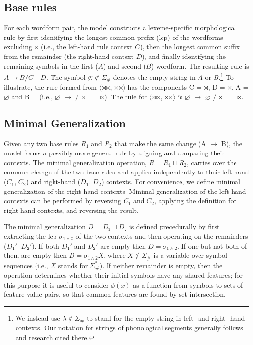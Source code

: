 \documentclass[11pt]{article}
\begin{document}
\subsection{Base rules}

For each wordform pair, the model constructs a lexeme-specific morphological rule by first identifying the longest common prefix (lcp) of the wordforms excluding $\ltimes$ (i.e., the left-hand rule context $C$), then the longest common suffix from the remainder (the right-hand context $D$), and finally identifying the remaining symbols in the first ($A$) and second ($B$) wordform. The resulting rule is $A \to B / C \ \underline{\ \ \ } \ D$. The symbol $\varnothing \notin \Sigma_{\#}$ denotes the empty string in $A$ or $B$.\footnote{We instead use $\lambda \notin \Sigma_{\#}$ to stand for the empty string in left- and right- hand contexts. Our notation for strings of phonological segments generally follows \citet{chandlee2017} and research cited there.} To illustrate, the rule formed from $\langle$$\rtimes$$\ltimes$, $\rtimes$$\ltimes$$\rangle$ has the components C = $\rtimes$, D = $\ltimes$, A = $\varnothing$ and B =  (i.e., $\varnothing$ $\to$  / $\rtimes$ \underline{\ \ \ } $\ltimes$). The rule for $\langle$$\rtimes$$\ltimes$, $\rtimes$$\ltimes$$\rangle$ is $\varnothing$ $\to$ $\varnothing$ / $\rtimes$ \underline{\ \ \ } $\ltimes$.

\subsection{Minimal Generalization}
\label{sec:mingenop}
Given any two base rules $R_1$ and $R_2$ that make the same change (A $\to$ B), the model forms a possibly more general rule by aligning and comparing their contexts. The minimal generalization operation, $R = R_1 \sqcap R_2$, carries over the common change of the two base rules and applies independently to their left-hand ($C_1$, $C_2$) and right-hand ($D_1$, $D_2$) contexts. For convenience, we define minimal generalization of the right-hand contexts. Minimal generalization of the left-hand contexts can be performed by reversing $C_1$ and $C_2$, applying the definition for right-hand contexts, and reversing the result.

The minimal generalization $D = D_1 \sqcap D_2$ is defined precedurally by first extracting the lcp $\sigma_{1\land2}$ of the two contexts and then operating on the remainders ($D_1'$, $D_2'$). If both $D_1'$ and $D_2'$ are empty then $D = \sigma_{1\land2}$. If one but not both of them are empty then $D = \sigma_{1\land2}X$, where $X \notin \Sigma_{\#}$ is a variable over symbol sequences (i.e., $X$ stands for $\Sigma_{\#}^*$). If neither remainder is empty, then the operation determines whether their initial symbols have any shared features; for this purpose it is useful to consider $\phi(x)$ as a function from symbols to sets of feature-value pairs, so that common features are found by set intersection.
\end{document}
